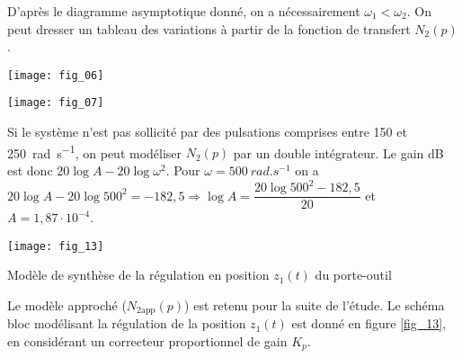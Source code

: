 \ifprof
\begin{corrige}
D'après le diagramme asymptotique donné, on a nécessairement $\omega_1<\omega_2$. On peut dresser un tableau des variations à partir de la fonction de transfert $N_2(p)$. 
\begin{center}
\texttt{[image: fig\_06]}

\texttt{[image: fig\_07]}
\end{center}
\end{corrige}
\else
\fi

\ifprof
\begin{corrige}
Si le système n'est pas sollicité par des pulsations comprises entre 150 et \SI{250}{rad.s^{-1}}, on peut modéliser $N_2(p)$ par un double intégrateur. 
Le gain dB est donc  $20\log A - 20 \log \omega^2$.  Pour $\omega=\SI{500}{rad.s^{-1}}$ on a $20\log A - 20 \log 500^2=-182,5 \Rightarrow \log A = \dfrac{20 \log 500^2-182,5}{20}$ et $A=1,87\cdot 10^{-4}$.
\end{corrige}
\else
\fi

\ifprof
\else

\begin{marginfigure}
\centering
\texttt{[image: fig\_13]}
\caption{Modèle de synthèse de la régulation en position $z_1(t)$ du porte-outil \label{fig_13}}
\end{marginfigure}

Le modèle approché ($N_{2 \text{app}}(p)$) est retenu pour la suite de l’étude. Le schéma bloc modélisant la régulation de
la position $z_1(t)$ est donné en figure \autoref{fig_13}, en considérant un correcteur proportionnel de gain $K_p$.


\fi


